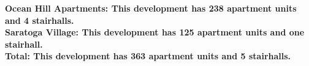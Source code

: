 \bf{Ocean Hill Apartments}: This development has 238 apartment units and 4 stairhalls.\\\bf{Saratoga Village}: This development has 125 apartment units and one stairhall.\\\bf{Total}: This development has 363 apartment units and 5 stairhalls.\\